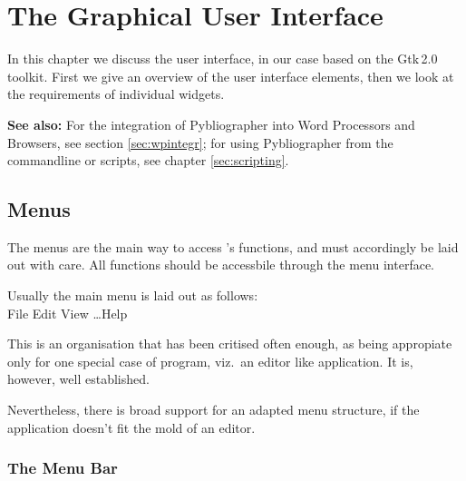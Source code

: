 \chapter{The Graphical User Interface}
\label{sec:gui}


In this chapter we discuss the user interface, in our case based on
the \textsf{Gtk\,2.0} toolkit. First we give an overview of the user
interface elements, then we look at the requirements of individual
widgets.

\textbf{See also:} For the integration of Pybliographer into Word
Processors and Browsers, see section \ref{sec:wpintegr}; for using
Pybliographer from the commandline or scripts, see chapter
\ref{sec:scripting}.





\section{Menus}
\label{sec:menus}

The menus are the main way to access \Pyb's functions, and must
accordingly be laid out with care. 
All functions  should  be accessbile through the menu interface.

Usually the main menu is laid out as follows:\\ \indent
 File \textbullet  Edit \textbullet View \textbullet \dots Help


This is an organisation that has been critised often enough, as being
appropiate only for one special case of program, viz.\ an editor like
application.  It is, however, well established.

Nevertheless, there is broad support for an adapted menu structure, if
the application doesn't fit the mold of an editor.

\subsection{The Menu Bar}
\label{sec:menusbar}


